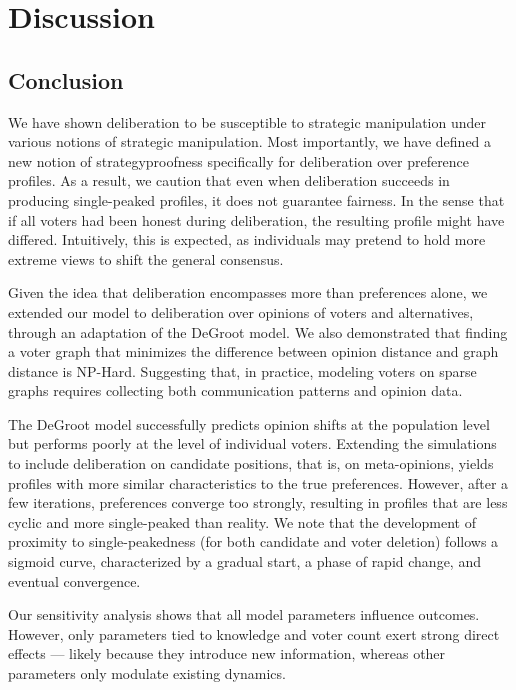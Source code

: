 \newpage
\chapter{Discussion}
\label{Discussion}


\section{Conclusion}

We have shown deliberation to be susceptible to strategic manipulation under
various notions of strategic manipulation. Most importantly, we have defined a
new notion of strategyproofness specifically for deliberation over preference
profiles. As a result, we caution that even when deliberation succeeds in
producing single-peaked profiles, it does not guarantee fairness. In the sense
that if all voters had been honest during deliberation, the resulting profile
might have differed. Intuitively, this is expected, as individuals may pretend
to hold more extreme views to shift the general consensus.

Given the idea that  deliberation encompasses more than preferences alone, we
extended our model to deliberation over opinions of voters and alternatives,
through an adaptation of the DeGroot model. We also demonstrated that finding a
voter graph that minimizes the difference between opinion distance and graph
distance is NP-Hard. Suggesting that, in practice, modeling voters on sparse
graphs requires collecting both communication patterns and opinion data.

The DeGroot model successfully predicts opinion shifts at the population level
but performs poorly at the level of individual voters. Extending the
simulations to include deliberation on candidate positions, that is, on
meta-opinions, yields profiles with more similar characteristics to the true
preferences. However, after a few iterations, preferences converge too
strongly, resulting in profiles that are less cyclic and more single-peaked
than reality. We note that the development of proximity to single-peakedness
(for both candidate and voter deletion) follows a sigmoid curve, characterized
by a gradual start, a phase of rapid change, and eventual convergence.

Our sensitivity analysis shows that all model parameters influence outcomes.
However, only parameters tied to knowledge and voter count exert strong direct
effects — likely because they introduce new information, whereas other
parameters only modulate existing dynamics.

